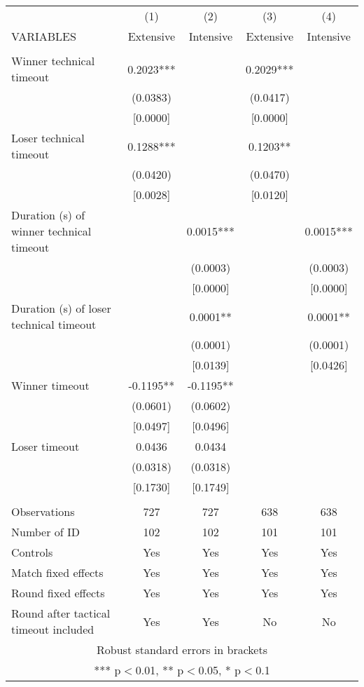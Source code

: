 \documentclass[]{article}
\begin{document}
\begin{tabular}{lcccc} \hline
 & (1) & (2) & (3) & (4) \\
VARIABLES & Extensive & Intensive & Extensive & Intensive \\ \hline
 &  &  &  &  \\
Winner technical timeout & 0.2023*** &  & 0.2029*** &  \\
 & (0.0383) &  & (0.0417) &  \\
 & [0.0000] &  & [0.0000] &  \\
Loser technical timeout & 0.1288*** &  & 0.1203** &  \\
 & (0.0420) &  & (0.0470) &  \\
 & [0.0028] &  & [0.0120] &  \\
Duration (s) of winner technical timeout &  & 0.0015*** &  & 0.0015*** \\
 &  & (0.0003) &  & (0.0003) \\
 &  & [0.0000] &  & [0.0000] \\
Duration (s) of loser technical timeout &  & 0.0001** &  & 0.0001** \\
 &  & (0.0001) &  & (0.0001) \\
 &  & [0.0139] &  & [0.0426] \\
Winner timeout & -0.1195** & -0.1195** &  &  \\
 & (0.0601) & (0.0602) &  &  \\
 & [0.0497] & [0.0496] &  &  \\
Loser timeout & 0.0436 & 0.0434 &  &  \\
 & (0.0318) & (0.0318) &  &  \\
 & [0.1730] & [0.1749] &  &  \\
 &  &  &  &  \\
Observations & 727 & 727 & 638 & 638 \\
Number of ID & 102 & 102 & 101 & 101 \\
Controls & Yes & Yes & Yes & Yes \\
Match fixed effects & Yes & Yes & Yes & Yes \\
Round fixed effects & Yes & Yes & Yes & Yes \\
 Round after tactical timeout included & Yes & Yes & No & No \\ \hline
\multicolumn{5}{c}{ Robust standard errors in brackets} \\
\multicolumn{5}{c}{ *** p$<$0.01, ** p$<$0.05, * p$<$0.1} \\
\end{tabular}
\end{document}
